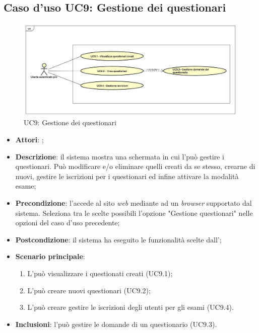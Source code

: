 \subsection{Caso d'uso UC9: Gestione dei questionari}
\label{UC9}
\begin{figure}[h]
	\centering
	\includegraphics[scale=0.5,keepaspectratio]{UML/UC9.png}
	\caption{UC9: Gestione dei questionari}
\end{figure}
\FloatBarrier
\begin{itemize}
	\item \textbf{Attori}: \uaupro;
	\item \textbf{Descrizione}: il sistema mostra una schermata in cui l'\uaupro può gestire i questionari. Può modificare e/o eliminare quelli creati da se stesso, crearne di nuovi, gestire le iscrizioni per i questionari ed infine attivare la modalità esame; 
	\item \textbf{Precondizione}: l'\uaupro accede al sito \textit{web} mediante ad un \textit{browser} supportato dal sistema. Seleziona tra le scelte possibili l'opzione "Gestione questionari" nelle opzioni del caso d'uso precedente;
	\item \textbf{Postcondizione}: il sistema ha eseguito le funzionalità scelte dall'\uaupro;
	\item \textbf{Scenario principale}:
		\begin{enumerate}
			\item L'\uaupro può visualizzare i questionati creati (UC9.1);
			\item L'\uaupro può creare nuovi questionari (UC9.2);
			\item L'\uaupro può creare gestire le iscrizioni degli utenti per gli esami (UC9.4).
		\end{enumerate}
		\item \textbf{Inclusioni}: l'\uaupro può gestire le domande di un questionario (UC9.3).		
\end{itemize}
							
